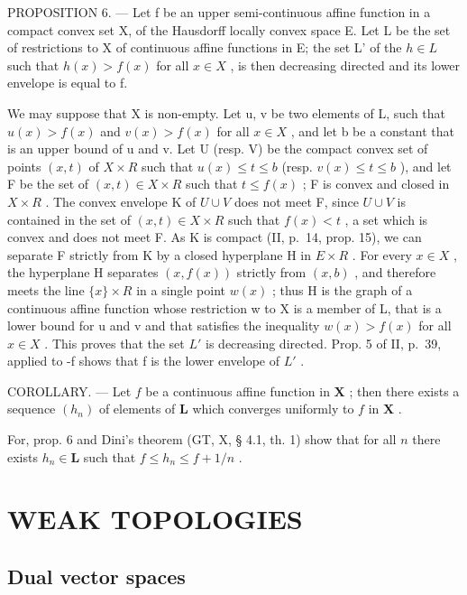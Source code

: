 PROPOSITION 6. --- Let f be an upper semi-continuous affine function in a compact convex set X, of the Hausdorff locally convex space E. Let L be the set of restrictions to X of continuous affine functions in E; the set L' of the \(h \in L\) such that \(h(x) > f(x)\) for all \(x \in X\) , is then decreasing directed and its lower envelope is equal to f.

We may suppose that X is non-empty. Let u, v be two elements of L, such that \(u(x) > f(x)\) and \(v(x) > f(x)\) for all \(x \in X\) , and let b be a constant that is an upper bound of u and v. Let U (resp. V) be the compact convex set of points \((x, t)\) of \(X \times R\) such that \(u(x) \leqslant t \leqslant b\) (resp. \(v(x) \leqslant t \leqslant b\) ), and let F be the set of \((x, t) \in X \times R\) such that \(t \leqslant f(x)\) ; F is convex and closed in \(X \times R\) . The convex envelope K of \(U \cup V\) does not meet F, since \(U \cup V\) is contained in the set of \((x, t) \in X \times R\) such that \(f(x) < t\) , a set which is convex and does not meet F. As K is compact (II, p.~14, prop. 15), we can separate F strictly from K by a closed hyperplane H in \(E \times R\) . For every \(x \in X\) , the hyperplane H separates \((x, f(x))\) strictly from \((x, b)\) , and therefore meets the line \(\{x\} \times R\) in a single point \(w(x)\) ; thus H is the graph of a continuous affine function whose restriction w to X is a member of L, that is a lower bound for u and v and that satisfies the inequality \(w(x) > f(x)\) for all \(x \in X\) . This proves that the set \(L'\) is decreasing directed. Prop. 5 of II, p.~39, applied to -f shows that f is the lower envelope of \(L'\) .

COROLLARY. --- Let \(f\) be a continuous affine function in \(\mathbf{X}\) ; then there exists a sequence \((h_n)\) of elements of \(\mathbf{L}\) which converges uniformly to \(f\) in \(\mathbf{X}\) .

For, prop. 6 and Dini's theorem (GT, X, § 4.1, th. 1) show that for all \(n\) there exists \(h_n \in \mathbf{L}\) such that \(f \leqslant h_n \leqslant f + 1/n\) .

\section{WEAK TOPOLOGIES}

\subsection{Dual vector spaces}

